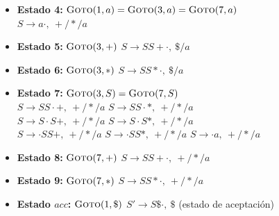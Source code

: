\documentclass[12pt, letterpaper]{article}
\begin{document}
\begin{enumerate}
\begin{itemize}
    \item \textbf{Estado 4:} $\textsc{Goto}(1,a)=\textsc{Goto}(3,a)=\textsc{Goto}(7,a)$ \\
    $S \to a\cdot,\ +/*/a$

    \item \textbf{Estado 5:} $\textsc{Goto}(3,+)$ \quad $S \to SS+\cdot,\ \$/a$

    \item \textbf{Estado 6:} $\textsc{Goto}(3,*)$ \quad $S \to SS*\cdot,\ \$/a$

    \item \textbf{Estado 7:} $\textsc{Goto}(3,S)=\textsc{Goto}(7,S)$ \\
    $S \to SS\cdot +,\ +/*/a$ \quad $S \to SS\cdot *,\ +/*/a$ \\
    $S \to S\cdot S+,\ +/*/a$ \quad $S \to S\cdot S*,\ +/*/a$ \\
    $S \to \cdot SS+,\ +/*/a$ \quad $S \to \cdot SS*,\ +/*/a$ \quad $S \to \cdot a,\ +/*/a$

    \item \textbf{Estado 8:} $\textsc{Goto}(7,+)$ \quad $S \to SS+\cdot,\ +/*/a$

    \item \textbf{Estado 9:} $\textsc{Goto}(7,*)$ \quad $S \to SS*\cdot,\ +/*/a$

    \item \textbf{Estado $acc$:} $\textsc{Goto}(1,\$)$ \quad $S' \to S\$\cdot,\ \$$ \quad (estado de aceptación)
\end{itemize}


\end{enumerate}
\end{document}
